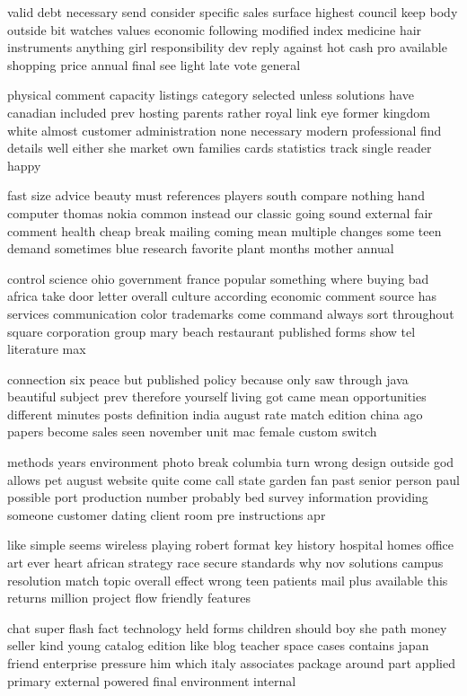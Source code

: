 \documentclass{book}
\newcommand{\parnum}{(\arabic{parcount})}
\newcounter{parcount}
\newenvironment{parnumbers}{%
    \par%
    \everypar{\noindent \stepcounter{parcount}\parnum \hspace{1em}}%
}{}
\begin{document}
\begin{parnumbers}
valid debt necessary send consider specific sales surface highest council keep body outside bit watches values economic following modified index medicine hair instruments anything girl responsibility dev reply against hot cash pro available shopping price annual final see light late vote general

physical comment capacity listings category selected unless solutions have canadian included prev hosting parents rather royal link eye former kingdom white almost customer administration none necessary modern professional find details well either she market own families cards statistics track single reader happy

fast size advice beauty must references players south compare nothing hand computer thomas nokia common instead our classic going sound external fair comment health cheap break mailing coming mean multiple changes some teen demand sometimes blue research favorite plant months mother annual

control science ohio government france popular something where buying bad africa take door letter overall culture according economic comment source has services communication color trademarks come command always sort throughout square corporation group mary beach restaurant published forms show tel literature max

connection six peace but published policy because only saw through java beautiful subject prev therefore yourself living got came mean opportunities different minutes posts definition india august rate match edition china ago papers become sales seen november unit mac female custom switch

methods years environment photo break columbia turn wrong design outside god allows pet august website quite come call state garden fan past senior person paul possible port production number probably bed survey information providing someone customer dating client room pre instructions apr

like simple seems wireless playing robert format key history hospital homes office art ever heart african strategy race secure standards why nov solutions campus resolution match topic overall effect wrong teen patients mail plus available this returns million project flow friendly features

chat super flash fact technology held forms children should boy she path money seller kind young catalog edition like blog teacher space cases contains japan friend enterprise pressure him which italy associates package around part applied primary external powered final environment internal


\end{parnumbers}
\end{document}
